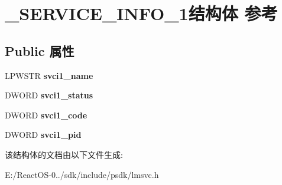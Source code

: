 \hypertarget{struct___s_e_r_v_i_c_e___i_n_f_o__1}{}\section{\+\_\+\+S\+E\+R\+V\+I\+C\+E\+\_\+\+I\+N\+F\+O\+\_\+1结构体 参考}
\label{struct___s_e_r_v_i_c_e___i_n_f_o__1}
\subsection*{Public 属性}
\begin{DoxyCompactItemize}
\item 
\mbox{\label{struct___s_e_r_v_i_c_e___i_n_f_o__1_ac20123ccf8dd0b8534201035fab78af2}} 
L\+P\+W\+S\+TR {\bfseries svci1\+\_\+name}
\item 
\mbox{\label{struct___s_e_r_v_i_c_e___i_n_f_o__1_a1e9d36b78c2bf08801d6778c35b000a9}} 
D\+W\+O\+RD {\bfseries svci1\+\_\+status}
\item 
\mbox{\label{struct___s_e_r_v_i_c_e___i_n_f_o__1_a3faae4d73038a383b9ccd3b723612d61}} 
D\+W\+O\+RD {\bfseries svci1\+\_\+code}
\item 
\mbox{\label{struct___s_e_r_v_i_c_e___i_n_f_o__1_ae2e22e0d509a8453ca5f06e471082012}} 
D\+W\+O\+RD {\bfseries svci1\+\_\+pid}
\end{DoxyCompactItemize}


该结构体的文档由以下文件生成\+:\begin{DoxyCompactItemize}
\item 
E\+:/\+React\+O\+S-\/0../sdk/include/psdk/lmsvc.\+h\end{DoxyCompactItemize}
